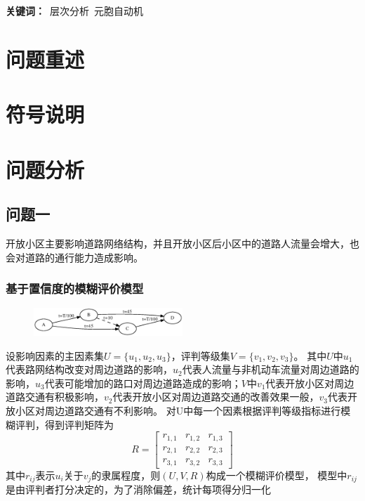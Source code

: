\documentclass[fontset=windows,a4paper,12pt]{ctexart}
\begin{document}
  \begin{center}
  \end{center}
  \linespread{1.2}
  \begin{center}
  \end{center}
  \textbf{关键词：}\ 层次分析\ 元胞自动机
  
  \section{问题重述}
  \section{符号说明}
  \section{问题分析}
	\subsection{问题一}
		开放小区主要影响道路网络结构，并且开放小区后小区中的道路人流量会增大，也会对道路的通行能力造成影响。

		\subsubsection{基于置信度的模糊评价模型}
			
			\begin{figure}
				\centering
				\includegraphics[width=0.5\textwidth]{pic/braess.eps}
			\end{figure}
			设影响因素的主因素集$ U=\{u_1,u_2,u_3\} $，评判等级集$ V=\{v_1,v_2,v_3\} $。
			其中$ U $中$ u_1 $代表路网结构改变对周边道路的影响，$ u_2 $代表人流量与非机动车流量对周边道路的影响，$ u_3 $代表可能增加的路口对周边道路造成的影响；$ V $中$ v_1 $代表开放小区对周边道路交通有积极影响，$ v_2 $代表开放小区对周边道路交通的改善效果一般，$ v_3 $代表开放小区对周边道路交通有不利影响。
			对U中每一个因素根据评判等级指标进行模糊评判，得到评判矩阵为
			$$
				R=\left[
				\begin{array}{cccc}
					r_{1,1} & r_{1,2} & r_{1,3}\\
					r_{2,1} & r_{2,2} & r_{2,3}\\
					r_{3,1} & r_{3,2} & r_{3,3}
				\end{array}
				\right]
			$$
			其中$ r_{ij} $表示$ u_i $关于$ v_j $的隶属程度，则$ (U,V,R) $构成一个模糊评价模型，
			模型中$ r_{ij} $是由评判者打分决定的，为了消除偏差，统计每项得分归一化
\end{document}
